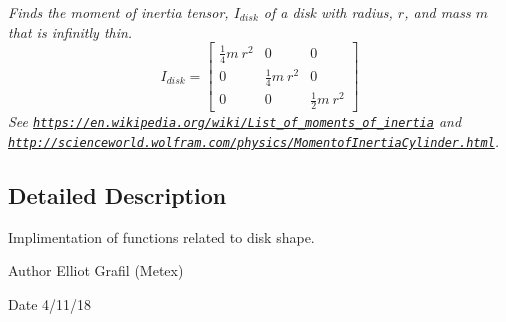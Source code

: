 \begin{DoxyCompactItemize}
\begin{DoxyCompactList}\small\item\em Finds the moment of inertia tensor, $I_{disk}$ of a disk with radius, $r$, and mass $m$ that is infinitly thin. \[ I_{disk}=\begin{bmatrix} \frac{1}{4}m\ r^2 & 0 & 0\\ 0 & \frac{1}{4}m\ r^2 & 0\\ 0 & 0 & \frac{1}{2}m\ r^2 \end{bmatrix} \] See \href{https://en.wikipedia.org/wiki/List_of_moments_of_inertia}{\tt https\+://en.\+wikipedia.\+org/wiki/\+List\+\_\+of\+\_\+moments\+\_\+of\+\_\+inertia} and \href{http://scienceworld.wolfram.com/physics/MomentofInertiaCylinder.html}{\tt http\+://scienceworld.\+wolfram.\+com/physics/\+Momentof\+Inertia\+Cylinder.\+html}. \end{DoxyCompactList}\end{DoxyCompactItemize}


\subsection{Detailed Description}
Implimentation of functions related to disk shape. 

\begin{DoxyAuthor}{Author}
Elliot Grafil (Metex) 
\end{DoxyAuthor}
\begin{DoxyDate}{Date}
4/11/18 
\end{DoxyDate}
